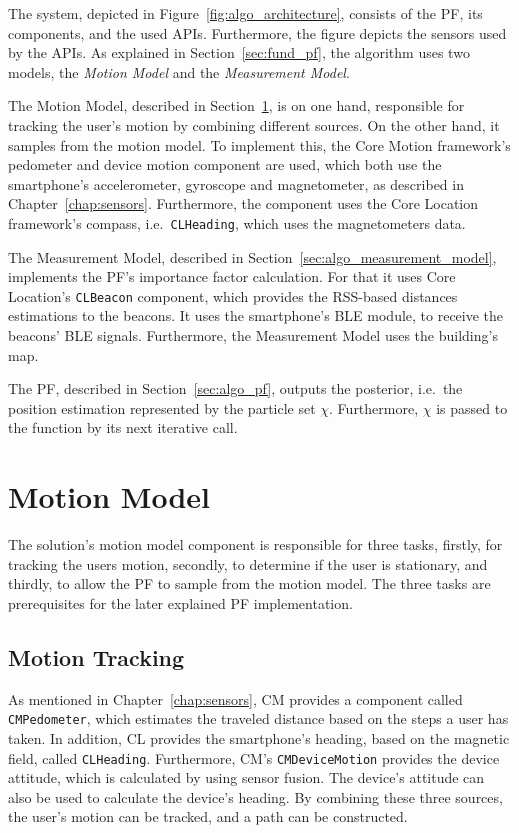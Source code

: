 The system, depicted in Figure~\ref{fig:algo_architecture}, consists of the \ac{PF}, its components, and the used \acsp{API}. Furthermore, the figure depicts the sensors used by the \acsp{API}. As explained in Section~\ref{sec:fund_pf}, the algorithm uses two models, the \emph{Motion Model} and the \emph{Measurement Model}.

The Motion Model, described in Section~\ref{sec:algo_motion_model}, is on one hand, responsible for tracking the user's motion by combining different sources. On the other hand, it samples from the motion model. To implement this, the Core Motion framework's pedometer and device motion component are used, which both use the smartphone's accelerometer, gyroscope and magnetometer, as described in Chapter~\ref{chap:sensors}. Furthermore, the component uses the Core Location framework's compass, i.e.\ \texttt{CLHeading}, which uses the magnetometers data.

The Measurement Model, described in Section~\ref{sec:algo_measurement_model}, implements the \acs{PF}'s importance factor calculation. For that it uses Core Location's \texttt{CLBeacon} component, which provides the \acs{RSS}-based distances estimations to the beacons. It uses the smartphone's \acf{BLE} module, to receive the beacons' \ac{BLE} signals. Furthermore, the Measurement Model uses the building's map.

The \acl{PF}, described in Section~\ref{sec:algo_pf}, outputs the posterior, i.e.\ the position estimation represented by the particle set $\chi$. Furthermore, $\chi$ is passed to the function by its next iterative call.


\section{Motion Model}\label{sec:algo_motion_model}
The solution's motion model component is responsible for three tasks, firstly, for tracking the users motion, secondly, to determine if the user is stationary, and thirdly, to allow the \acs{PF} to sample from the motion model. The three tasks are prerequisites for the later explained \acs{PF} implementation.

\subsection{Motion Tracking}
As mentioned in Chapter~\ref{chap:sensors}, \acl{CM} provides a component called \texttt{CMPedometer}, which estimates the traveled distance based on the steps a user has taken. In addition, \acl{CL} provides the smartphone's heading, based on the magnetic field, called \texttt{CLHeading}. Furthermore, \ac{CM}'s \texttt{CMDeviceMotion} provides the device attitude, which is calculated by using sensor fusion. The device's attitude can also be used to calculate the device's heading. By combining these three sources, the user's motion can be tracked, and a path can be constructed.

